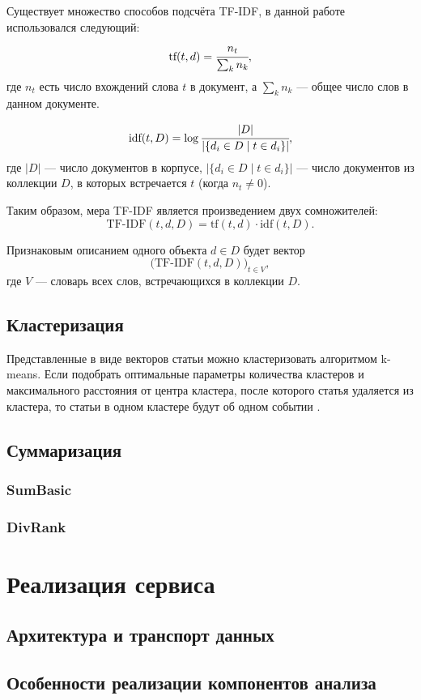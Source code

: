 \documentclass[a4paper, 14pt]{extarticle}
\begin{document}
Существует множество способов подсчёта TF-IDF, в данной работе использовался следующий:
$$
\text{tf}(t, d) = \cfrac{n_t}{\sum_{k} n_k},
$$
где $n_{t}$ есть число вхождений слова $t$ в документ, а $\sum_{k} n_k$ --- общее число слов в данном документе.

$$
\text{idf}(t, D) = \log{ \cfrac{|D|}{|\{ d_i \in D \mid t \in d_i \}|}},
$$
где $|D|$ --- число документов в корпусе, $|\{ d_i \in D \mid t \in d_i \}|$ — число документов из коллекции $D$, в которых встречается 
$t$ (когда $n_{t} \neq 0$).

Таким образом, мера TF-IDF является произведением двух сомножителей:
$$
\text{TF-IDF}(t, d, D) = \text{tf}(t, d) \cdot \text{idf}(t, D).
$$

Признаковым описанием одного объекта $d \in D$ будет вектор
$$
\big(\text{TF-IDF}(t,d,D)\big)_{t\in V},
$$
где $V$ --- словарь всех слов, встречающихся в коллекции $D$.


\subsection{Кластеризация}
Представленные в виде векторов статьи можно кластеризовать алгоритмом k-means. Если подобрать оптимальные параметры количества кластеров и максимального расстояния от центра кластера, после которого статья удаляется из кластера, то статьи в одном кластере будут об одном событии \cite{km}.

\subsection{Суммаризация}
\subsubsection{SumBasic}
\subsubsection{DivRank}


\section{Реализация сервиса}
\subsection{Архитектура и транспорт данных}
\subsection{Особенности реализации компонентов анализа}
\end{document}
